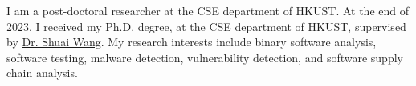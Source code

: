 I am a post-doctoral researcher at the CSE department of HKUST.
At the end of 2023, I received my Ph.D. degree, at the CSE department of HKUST,
supervised by \href{https://www.cse.ust.hk/~shuaiw/}{Dr. Shuai Wang}.
My research interests include binary software analysis, software testing,
malware detection, vulnerability detection, and software supply chain analysis.
